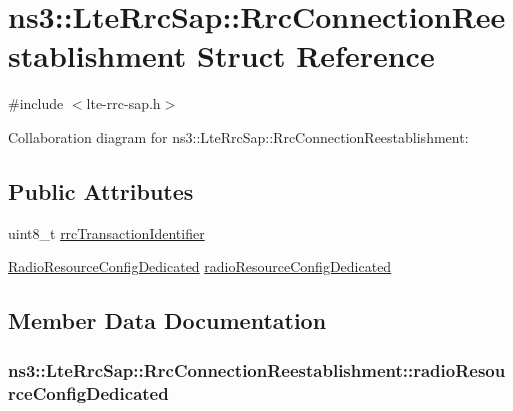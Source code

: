 \hypertarget{structns3_1_1LteRrcSap_1_1RrcConnectionReestablishment}{}\section{ns3\+:\+:Lte\+Rrc\+Sap\+:\+:Rrc\+Connection\+Reestablishment Struct Reference}
\label{structns3_1_1LteRrcSap_1_1RrcConnectionReestablishment}


{\ttfamily \#include $<$lte-\/rrc-\/sap.\+h$>$}



Collaboration diagram for ns3\+:\+:Lte\+Rrc\+Sap\+:\+:Rrc\+Connection\+Reestablishment\+:
\subsection*{Public Attributes}
\begin{DoxyCompactItemize}
\item 
uint8\+\_\+t \hyperlink{structns3_1_1LteRrcSap_1_1RrcConnectionReestablishment_acd894e6f1f5a38a2a87f5968a10802cd}{rrc\+Transaction\+Identifier}
\item 
\hyperlink{structns3_1_1LteRrcSap_1_1RadioResourceConfigDedicated}{Radio\+Resource\+Config\+Dedicated} \hyperlink{structns3_1_1LteRrcSap_1_1RrcConnectionReestablishment_ac8c576ec1c5909704cced17ca5566b29}{radio\+Resource\+Config\+Dedicated}
\end{DoxyCompactItemize}


\subsection{Member Data Documentation}
\subsubsection[{\texorpdfstring{radio\+Resource\+Config\+Dedicated}{radioResourceConfigDedicated}}]{ ns3\+::\+Lte\+Rrc\+Sap\+::\+Rrc\+Connection\+Reestablishment\+::radio\+Resource\+Config\+Dedicated}\hypertarget{structns3_1_1LteRrcSap_1_1RrcConnectionReestablishment_ac8c576ec1c5909704cced17ca5566b29}{}\label{structns3_1_1LteRrcSap_1_1RrcConnectionReestablishment_ac8c576ec1c5909704cced17ca5566b29}
